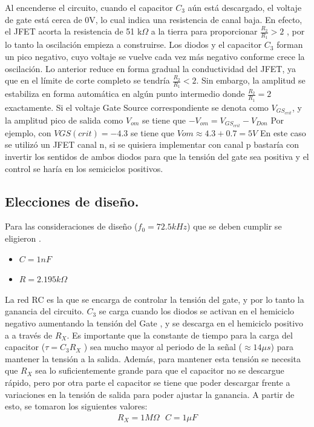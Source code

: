 Al encenderse el circuito, cuando el capacitor $C_3$ aún está descargado, el voltaje de gate está cerca de 0V, lo cual
indica una resistencia de canal baja. En efecto, el JFET acorta la resistencia de 51 k$\Omega$ a la
tierra para proporcionar $\frac{R_2}{R_1}>2$ , por lo tanto la oscilación
empieza a construirse. Los diodos y el capacitor $C_3$ forman un pico negativo, cuyo
voltaje se vuelve cada vez más negativo conforme crece la oscilación. Lo anterior reduce en
forma gradual la conductividad del JFET, ya que en el límite de corte completo se tendría $\frac{R_2}{R_1}<2$. Sin embargo, la amplitud se estabiliza en forma automática en
algún punto intermedio donde $\frac{R_2}{R_1}=2$ exactamente. Si el voltaje Gate Source correspondiente se denota como $V_{GS_{crit}}$, y la amplitud pico de salida como $V_{om}$ se tiene que $-V_{om} =V_{GS_{crit}} - V_{Don}$ Por ejemplo, con $VGS(crit) = -4.3$ se tiene que $Vom \approx 4.3 + 0.7 = 5 V$
En este caso se utilizó un JFET canal n, si se quisiera implementar con canal p bastaría con invertir los sentidos de ambos diodos para que la tensión del gate sea positiva y el control se haría en los semiciclos positivos.\\

\subsection{Elecciones de diseño.}
Para las consideraciones de diseño ($f_0 = 72.5 kHz$) que se deben cumplir se eligieron . \begin{itemize}
\item$C=1nF$
\item$R=2.195k\Omega$
\end{itemize} 

La red RC es la que se encarga de controlar la tensión del gate, y por lo tanto la ganancia del circuito. $C_3$ se carga cuando los diodos se activan en el hemiciclo negativo aumentando la tensión  del Gate , y se descarga en el hemiciclo positivo a a través de $R_X$. Es importante que la constante de tiempo para la carga del capacitor ($\tau=C_3R_X$ ) sea mucho mayor al periodo de la señal ($\approx 14\mu s$) para mantener la tensión a la salida. Además, para mantener esta tensión se necesita que $R_X$ sea lo suficientemente grande para que el capacitor no se descargue rápido, pero por otra parte el capacitor se tiene que poder descargar frente a variaciones en la
tensión de salida para poder ajustar la ganancia.
A partir de esto, se tomaron los siguientes valores:
\begin{align}
R_X=1M\Omega \ \ \ C=1\mu F
\end{align}

